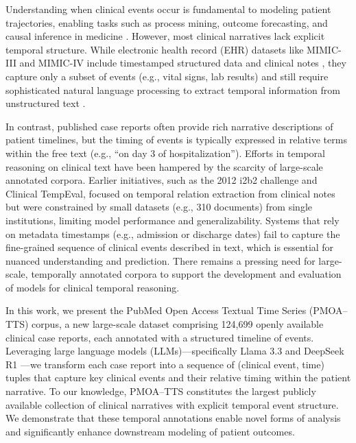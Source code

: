 Understanding when clinical events occur is fundamental to modeling patient trajectories, enabling tasks such as process mining, outcome forecasting, and causal inference in medicine \citep{jensen2012mining, noren2010temporal}.
However, most clinical narratives lack explicit temporal structure. While electronic health record (EHR) datasets like MIMIC-III and MIMIC-IV include timestamped structured data and clinical notes \citep{johnson2016mimic, johnson2023mimic}, they capture only a subset of events (e.g., vital signs, lab results) and still require sophisticated natural language processing to extract temporal information from unstructured text \citep{viani2021temporal, cheng2023typed}.

In contrast, published case reports often provide rich narrative descriptions of patient timelines, but the timing of events is typically expressed in relative terms within the free text (e.g., “on day 3 of hospitalization”).
Efforts in temporal reasoning on clinical text have been hampered by the scarcity of large-scale annotated corpora.
Earlier initiatives, such as the 2012 i2b2 challenge and Clinical TempEval, focused on temporal relation extraction from clinical notes \citep{sun2013evaluating, bethard2016semeval, galvan2018investigating} but were constrained by small datasets (e.g., 310 documents) from single institutions, limiting model performance and generalizability.
Systems that rely on metadata timestamps (e.g., admission or discharge dates) fail to capture the fine-grained sequence of clinical events described in text, which is essential for nuanced understanding and prediction.
There remains a pressing need for large-scale, temporally annotated corpora to support the development and evaluation of models for clinical temporal reasoning.

In this work, we present the PubMed Open Access Textual Time Series (PMOA–TTS) corpus, a new large-scale dataset comprising 124,699 openly available clinical case reports, each annotated with a structured timeline of events.
Leveraging large language models (LLMs)—specifically Llama 3.3 \citep{grattafiori2024llama} and DeepSeek R1 \citep{guo2025deepseek}—we transform each case report into a sequence of (clinical event, time) tuples that capture key clinical events and their relative timing within the patient narrative.
To our knowledge, PMOA–TTS constitutes the largest publicly available collection of clinical narratives with explicit temporal event structure.
We demonstrate that these temporal annotations enable novel forms of analysis and significantly enhance downstream modeling of patient outcomes.

